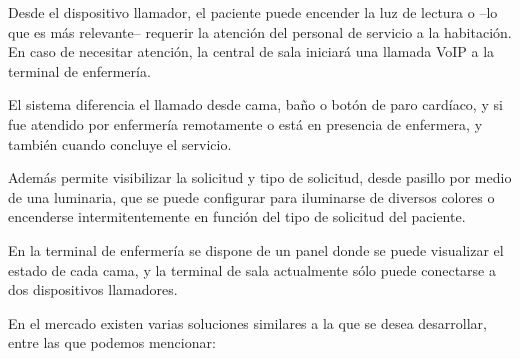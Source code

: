 Desde el dispositivo llamador, el paciente puede encender la luz de lectura o –lo que es más relevante– requerir la atención del personal de servicio a la habitación. En caso de necesitar atención, la central de sala iniciará una llamada VoIP a la terminal de enfermería.

El sistema diferencia el llamado desde cama, baño o botón de paro cardíaco, y si fue atendido por enfermería remotamente o está en presencia de enfermera, y también cuando concluye el servicio.

Además permite visibilizar la solicitud y tipo de solicitud, desde pasillo por medio de una luminaria, que se puede configurar para iluminarse de diversos colores o encenderse intermitentemente en función del tipo de solicitud del paciente.

En la terminal de enfermería se dispone de un panel donde se puede visualizar el estado de cada cama, y la terminal de sala actualmente sólo puede conectarse a dos dispositivos llamadores.

En el mercado existen varias soluciones similares a la que se desea desarrollar, entre las que podemos mencionar:

